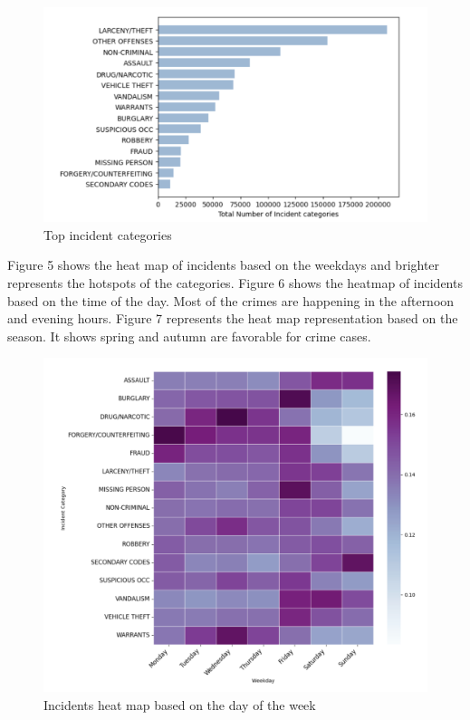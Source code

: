 \documentclass[conference,final,]{IEEEtran}
\begin{document}
\begin{figure}

{\centering \includegraphics[width=0.7\linewidth]{img/fig4} 

}

\caption{Top incident categories}\label{fig:unnamed-chunk-4}
\end{figure}

Figure 5 shows the heat map of incidents based on the weekdays and
brighter represents the hotspots of the categories. Figure 6 shows the
heatmap of incidents based on the time of the day. Most of the crimes
are happening in the afternoon and evening hours. Figure 7 represents
the heat map representation based on the season. It shows spring and
autumn are favorable for crime cases.

\begin{figure}

{\centering \includegraphics[width=0.7\linewidth]{img/fig5} 

}

\caption{Incidents heat map based on the day of the week}\label{fig:unnamed-chunk-5}
\end{figure}
\end{document}
